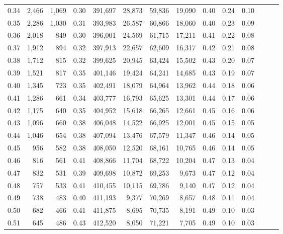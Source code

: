 \begin{tabular}{rrrrrrrrrrrrrr}
0.34 &   2,466 &  1,069 &  0.30 &  391,697 &   28,873 &  59,836 &  19,090 &  0.40 &  0.24 &      0.10 \\
0.35 &   2,286 &  1,030 &  0.31 &  393,983 &   26,587 &  60,866 &  18,060 &  0.40 &  0.23 &      0.09 \\
0.36 &   2,018 &    849 &  0.30 &  396,001 &   24,569 &  61,715 &  17,211 &  0.41 &  0.22 &      0.08 \\
0.37 &   1,912 &    894 &  0.32 &  397,913 &   22,657 &  62,609 &  16,317 &  0.42 &  0.21 &      0.08 \\
0.38 &   1,712 &    815 &  0.32 &  399,625 &   20,945 &  63,424 &  15,502 &  0.43 &  0.20 &      0.07 \\
0.39 &   1,521 &    817 &  0.35 &  401,146 &   19,424 &  64,241 &  14,685 &  0.43 &  0.19 &      0.07 \\
0.40 &   1,345 &    723 &  0.35 &  402,491 &   18,079 &  64,964 &  13,962 &  0.44 &  0.18 &      0.06 \\
0.41 &   1,286 &    661 &  0.34 &  403,777 &   16,793 &  65,625 &  13,301 &  0.44 &  0.17 &      0.06 \\
0.42 &   1,175 &    640 &  0.35 &  404,952 &   15,618 &  66,265 &  12,661 &  0.45 &  0.16 &      0.06 \\
0.43 &   1,096 &    660 &  0.38 &  406,048 &   14,522 &  66,925 &  12,001 &  0.45 &  0.15 &      0.05 \\
0.44 &   1,046 &    654 &  0.38 &  407,094 &   13,476 &  67,579 &  11,347 &  0.46 &  0.14 &      0.05 \\
0.45 &     956 &    582 &  0.38 &  408,050 &   12,520 &  68,161 &  10,765 &  0.46 &  0.14 &      0.05 \\
0.46 &     816 &    561 &  0.41 &  408,866 &   11,704 &  68,722 &  10,204 &  0.47 &  0.13 &      0.04 \\
0.47 &     832 &    531 &  0.39 &  409,698 &   10,872 &  69,253 &   9,673 &  0.47 &  0.12 &      0.04 \\
0.48 &     757 &    533 &  0.41 &  410,455 &   10,115 &  69,786 &   9,140 &  0.47 &  0.12 &      0.04 \\
0.49 &     738 &    483 &  0.40 &  411,193 &    9,377 &  70,269 &   8,657 &  0.48 &  0.11 &      0.04 \\
0.50 &     682 &    466 &  0.41 &  411,875 &    8,695 &  70,735 &   8,191 &  0.49 &  0.10 &      0.03 \\
0.51 &     645 &    486 &  0.43 &  412,520 &    8,050 &  71,221 &   7,705 &  0.49 &  0.10 &      0.03 \\

\end{tabular}
